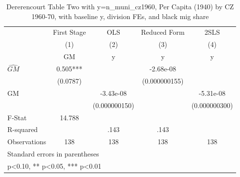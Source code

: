 \begin{table}[htbp]\centering
\def\sym#1{\ifmmode^{#1}\else\(^{#1}\)\fi}
\caption{Dererencourt Table Two with y=n\_muni\_cz1960, Per Capita (1940) by CZ 1960-70, with baseline y, division FEs, and black mig share}
\begin{tabular}{l*{4}{c}}
\toprule
                    & First Stage   &         OLS   &Reduced Form   &        2SLS   \\
                    &\multicolumn{1}{c}{(1)}&\multicolumn{1}{c}{(2)}&\multicolumn{1}{c}{(3)}&\multicolumn{1}{c}{(4)}\\
                    &\multicolumn{1}{c}{GM}&\multicolumn{1}{c}{y}&\multicolumn{1}{c}{y}&\multicolumn{1}{c}{y}\\
\midrule
$\hat{GM}$          &       0.505***&               &   -2.68e-08   &               \\
                    &    (0.0787)   &               &(0.000000155)   &               \\
\addlinespace
GM                  &               &   -3.43e-08   &               &   -5.31e-08   \\
                    &               &(0.000000150)   &               &(0.000000300)   \\
\midrule
F-Stat              &      14.788   &               &               &               \\
R-squared           &               &        .143   &        .143   &               \\
Observations        &         138   &         138   &         138   &         138   \\
\bottomrule
\multicolumn{5}{l}{\footnotesize Standard errors in parentheses}\\
\multicolumn{5}{l}{\footnotesize * p<0.10, ** p<0.05, *** p<0.01}\\
\end{tabular}
\end{table}
